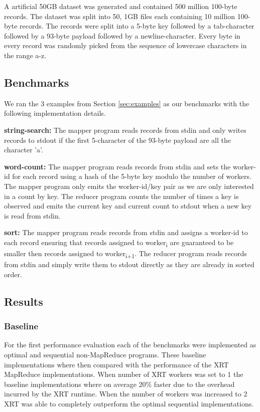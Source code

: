 \documentclass[twocolumn,11px]{article}       %
\begin{document}
A artificial 50GB dataset was generated and contained 500 million 100-byte records.
The dataset was split into 50, 1GB files each containing 10 million 100-byte records.
The records were split into a 5-byte key followed by a tab-character followed by a 93-byte payload followed by a newline-character.
Every byte in every record was randomly picked from the sequence of lowercase characters in the range a-z.

\subsection{Benchmarks}

We ran the 3 examples from Section \ref{sec:examples} as our benchmarks with the following implementation details.

\bigskip
\noindent
\textbf{string-search:} The mapper program reads records from stdin and only writes records to stdout if the first 5-character of the 93-byte payload are all the character 'a'.

\bigskip
\noindent
\textbf{word-count:} The mapper program reads records from stdin and sets the worker-id for each record using a hash of the 5-byte key modulo the number of workers.
The mapper program only emits the worker-id/key pair as we are only interested in a count by key.
The reducer program counts the number of times a key is observed and emits the current key and current count to stdout when a new key is read from stdin.

\bigskip
\noindent
\textbf{sort:} The mapper program reads records from stdin and assigns a worker-id to each record ensuring that records assigned to worker\textsubscript{i} are guaranteed to be smaller then records assigned to worker\textsubscript{i+1}.
The reducer program reads records from stdin and simply write them to stdout directly as they are already in sorted order.

\subsection{Results}

\subsubsection{Baseline}

For the first performance evaluation each of the benchmarks were implemented as optimal and sequential non-MapReduce programs.
These baseline implementations where then compared with the performance of the XRT MapReduce implementations.
When number of XRT workers was set to 1 the baseline implementations where on average 20\% faster due to the overhead incurred by the XRT runtime.
When the number of workers was increased to 2 XRT was able to completely outperform the optimal sequential implementations.
\end{document}
